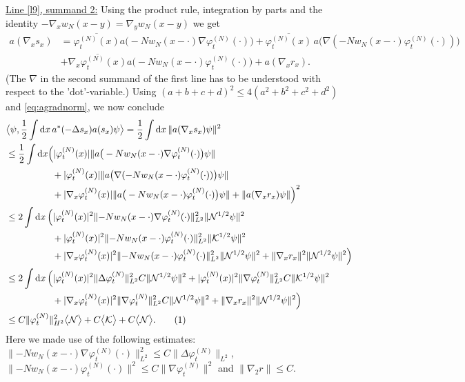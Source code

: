 \documentclass[11pt,a4paper,draft,DIV11]{scrartcl}	%
\newcommand{\di}{\textrm{d}}		%
\newcommand{\Ncal}{\mathcal{N}}		%
\newcommand{\Kcal}{\mathcal{K}}		%
\newcommand{\estlist}[2]{\underline{Line \ref{l#1}, summand #2:}}
\newcommand{\scal}[2]{\big<#1,#2\big>} %
\newcommand{\cc}[1]{\overline{#1}}	%
\newcommand{\norm}[1]{\lVert#1\rVert}	%
\newcommand{\ev}[1]{\big<#1\big>}	%
\newcommand{\ph}{\varphi_t^{(N)}}	%
\newcommand{\gradone}{\nabla_2}
\newcommand{\tagg}[1]{ \stepcounter{equation} \tag{\theequation} \label{eq:#1} } %
\newcommand{\eqr}[1]{\eqref{eq:#1}}			%
\begin{document}
\estlist{9}{2}
Using the product rule, integration by parts and the identity $-\nabla_x w_N(x-y) = \nabla_y w_N(x-y)$ we get
\begin{align*}
 a(\nabla_x s_x) & = \cc{\ph(x)} a\big(-Nw_N(x-\cdot)\nabla\ph(\cdot)\big) + \cc{\ph(x)}\,a\big(\nabla(-N w_N(x-\cdot)\ph(\cdot))\big) \\
 & + \cc{\nabla_x \ph(x)} a\big(-Nw_N(x-\cdot)\ph(\cdot)\big) + a(\nabla_x r_x).
\end{align*}
(The $\nabla$ in the second summand of the first line has to be understood with respect to the 'dot'-variable.)
Using $(a+b+c+d)^2 \leq 4(a^2+b^2+c^2+d^2)$ and \eqr{agradnorm}, we now conclude
\begin{align*}
 & \scal{\psi}{\frac{1}{2}\int \di x\, a^\ast(-\Delta s_x) a(s_x)\psi} = \frac{1}{2}\int \di x\, \norm{a(\nabla_x s_x)\psi}^2 \\
& \leq \frac{1}{2} \int \di x \Big( \lvert \ph(x)\rvert \norm{a\big(-Nw_N(x-\cdot)\nabla\ph(\cdot)\big)\psi} \\
& \qquad\qquad\quad + \lvert \ph(x)\rvert \norm{a\big(\nabla(-N w_N(x-\cdot)\ph(\cdot))\big)\psi} \\
& \qquad\qquad\quad + \lvert \nabla_x \ph(x)\rvert \norm{a\big(-Nw_N(x-\cdot)\ph(\cdot)\big)\psi} + \norm{a(\nabla_x r_x)\psi}  \Big)^2 \\
& \leq 2\int \di x\, \Big( \lvert \ph(x)\rvert^2 \norm{-N w_N(x-\cdot)\nabla\ph(\cdot)}_{L^2}^2 \norm{\Ncal^{1/2}\psi}^2  \\
& \qquad\qquad\quad + \lvert \ph(x)\rvert^2 \norm{-Nw_N(x-\cdot) \ph(\cdot)}_{L^2}^2 \norm{\Kcal^{1/2}\psi}^2  \\
& \qquad\qquad\quad + \lvert \nabla_x \ph(x)\rvert^2 \norm{-N w_N(x-\cdot) \ph(\cdot)}_{L^2}^2 \norm{\Ncal^{1/2}\psi}^2 + \norm{\nabla_x r_x}^2 \norm{\Ncal^{1/2}\psi}^2 \Big) \\
& \leq 2 \int \di x\, \Big( \lvert \ph(x)\rvert^2 \norm{\Delta \ph}_{L^2}^2 C \norm{\Ncal^{1/2}\psi}^2 + \lvert \ph(x)\rvert^2 \norm{\nabla \ph}_{L^2}^2 C \norm{\Kcal^{1/2}\psi}^2 \\
& \qquad\qquad\quad + \lvert \nabla_x \ph(x)\rvert^2 \norm{\nabla \ph}_{L^2}^2 C \norm{\Ncal^{1/2}\psi}^2 + \norm{\nabla_x r_x}^2 \norm{\Ncal^{1/2}\psi}^2 \Big)\\
& \leq C \norm{\ph}_{H^2}^2 \ev{\Ncal} + C\ev{\Kcal} + C\ev{\Ncal}. \tagg{bound2B}
\end{align*}
Here we made use of the following estimates: $\norm{-N w_N(x-\cdot) \nabla\ph(\cdot)}_{L^2}^2 \leq C\norm{\Delta \ph}_{L^2}$, $\norm{-N w_N(x-\cdot)\ph(\cdot)}^2 \leq C \norm{\nabla \ph}^2$  and $ \norm{\gradone r} \leq C$.\newline
\end{document}
